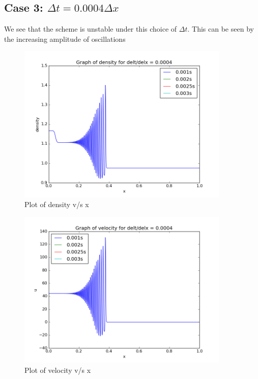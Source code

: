 \documentclass[11pt, a4paper]{article}
\begin{document}
\subsection{Case 3: $\Delta t = 0.0004 \Delta x$}

We see that the scheme is unstable under this choice of $\Delta t$. This can be seen by the increasing amplitude of oscillations
\begin{figure}[H]
 \centering
 \includegraphics[width = 0.9\textwidth]{FTCS2_3_1.png}
 \caption{Plot of density v/s x}
\end{figure}
\begin{figure}[H]
 \centering
 \includegraphics[width = 0.9\textwidth]{FTCS2_3_4.png}
 \caption{Plot of velocity v/s x}
\end{figure}
\end{document}

